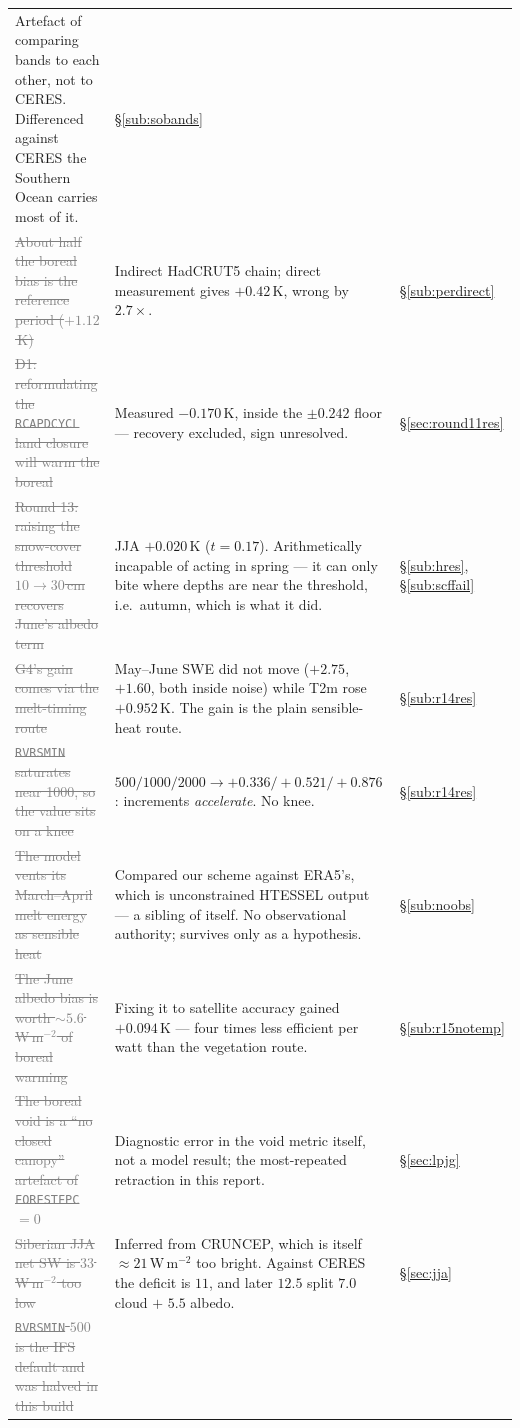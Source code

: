 \documentclass[10pt]{article}
\newcommand{\dead}[1]{\textcolor{gray}{\sout{#1}}}
\begin{document}
\begin{center}
\begin{tabular}{p{} p{} l}
Artefact of comparing bands to each other, not to CERES. Differenced against CERES the
Southern Ocean carries most of it. & \S\ref{sub:sobands} \\
\dead{About half the boreal bias is the reference period ($+1.12$\,K)} &
Indirect HadCRUT5 chain; direct measurement gives $+0.42$\,K, wrong by $2.7\times$. &
\S\ref{sub:perdirect} \\
\dead{D1: reformulating the \texttt{RCAPDCYCL} land closure will warm the boreal} &
Measured $-0.170$\,K, inside the $\pm0.242$ floor --- recovery excluded, sign unresolved. & \S\ref{sec:round11res} \\
\dead{Round 13: raising the snow-cover threshold $10\to30$\,cm recovers June's albedo term} &
JJA $+0.020$\,K ($t{=}0.17$). Arithmetically incapable of acting in spring --- it can only
bite where depths are near the threshold, i.e.\ autumn, which is what it did. &
\S\ref{sub:hres}, \S\ref{sub:scffail} \\
\dead{G4's gain comes via the melt-timing route} &
May--June SWE did not move ($+2.75$, $+1.60$, both inside noise) while T2m rose $+0.952$\,K.
The gain is the plain sensible-heat route. & \S\ref{sub:r14res} \\
\dead{\texttt{RVRSMIN} saturates near 1000, so the value sits on a knee} &
$500/1000/2000 \to +0.336/+0.521/+0.876$: increments \emph{accelerate}. No knee. &
\S\ref{sub:r14res} \\
\dead{The model vents its March--April melt energy as sensible heat} &
Compared our scheme against ERA5's, which is unconstrained HTESSEL output --- a sibling of
itself. No observational authority; survives only as a hypothesis. & \S\ref{sub:noobs} \\
\dead{The June albedo bias is worth ${\sim}5.6$\,W\,m$^{-2}$ of boreal warming} &
Fixing it to satellite accuracy gained $+0.094$\,K --- four times less efficient per watt than
the vegetation route. & \S\ref{sub:r15notemp} \\
\dead{The boreal void is a ``no closed canopy'' artefact of \texttt{FORESTFPC}$=0$} &
Diagnostic error in the void metric itself, not a model result; the most-repeated retraction
in this report. & \S\ref{sec:lpjg} \\
\dead{Siberian JJA net SW is $33$\,W\,m$^{-2}$ too low} &
Inferred from CRUNCEP, which is itself ${\approx}21$\,W\,m$^{-2}$ too bright. Against CERES
the deficit is $11$, and later $12.5$ split $7.0$ cloud $+$ $5.5$ albedo. & \S\ref{sec:jja} \\
\dead{\texttt{RVRSMIN} $500$ is the IFS default and was halved in this build} &

\end{tabular}
\end{center}
\end{document}
